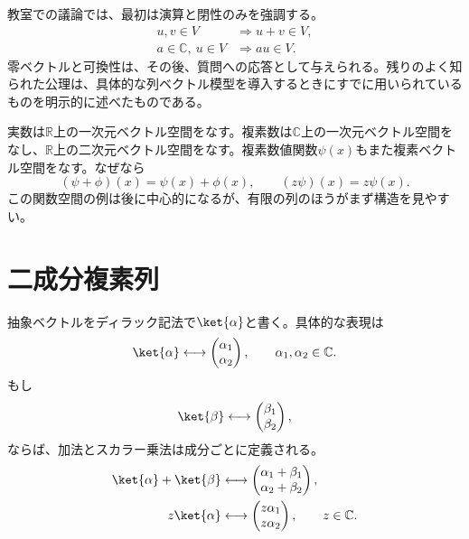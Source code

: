 教室での議論では、最初は演算と閉性のみを強調する。
\begin{equation}
\begin{aligned}
  u,v\in V&\Longrightarrow u+v\in V,\\
  a\in\mathbb C,\ u\in V&\Longrightarrow au\in V.
\end{aligned}
\end{equation}
零ベクトルと可換性は、その後、質問への応答として与えられる。残りのよく知られた公理は、具体的な列ベクトル模型を導入するときにすでに用いられているものを明示的に述べたものである。

実数は\(\mathbb R\)上の一次元ベクトル空間をなす。複素数は\(\mathbb C\)上の一次元ベクトル空間をなし、\(\mathbb R\)上の二次元ベクトル空間をなす。複素数値関数\(\psi(x)\)もまた複素ベクトル空間をなす。なぜなら
\begin{equation}
  (\psi+\phi)(x)=\psi(x)+\phi(x),
  \qquad
  (z\psi)(x)=z\psi(x).
\end{equation}
この関数空間の例は後に中心的になるが、有限の列のほうがまず構造を見やすい。

\begin{classroomqa}
\end{classroomqa}

\section{二成分複素列}

抽象ベクトルをディラック記法で\(\ket{\alpha}\)と書く。具体的な表現は
\begin{equation}
  \ket{\alpha}
  \longleftrightarrow
  \begin{pmatrix}
    \alpha_1\\
    \alpha_2
  \end{pmatrix},
  \qquad
  \alpha_1,\alpha_2\in\mathbb C.
\end{equation}
もし
\begin{equation}
  \ket{\beta}
  \longleftrightarrow
  \begin{pmatrix}
    \beta_1\\
    \beta_2
  \end{pmatrix},
\end{equation}
ならば、加法とスカラー乗法は成分ごとに定義される。
\begin{align}
  \ket{\alpha}+\ket{\beta}
  &\longleftrightarrow
  \begin{pmatrix}
    \alpha_1+\beta_1\\
    \alpha_2+\beta_2
  \end{pmatrix},\\
  z\ket{\alpha}
  &\longleftrightarrow
  \begin{pmatrix}
    z\alpha_1\\
    z\alpha_2
  \end{pmatrix},
  \qquad z\in\mathbb C.
\end{align}

